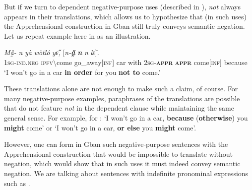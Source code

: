\documentclass[output=paper,colorlinks,citecolor=brown
]{langscibook}
\begin{document}
But if we turn to dependent negative-purpose uses (described in ), \textit{not} always appears in their translations, which allows us to hypothesize that (in such uses) the Apprehensional construction in Gban still truly conveys semantic negation. Let us repeat example  here in  as an illustration.


\ea \label{ex:Fed69}
\gll \textit{Mȁ̰-{\à}} \textit{n{\ù}} \textit{yà} \textit{wȍtló} \textit{yɛ̋,} \textup{[}\textit{n-\textbf{a̰̋}} \textit{\textbf{n{\ù}}} \textit{n{\ù}} \textit{lɛ̌}\textup{]}\textit{.}\\
\textsc{1sg-ind.neg} \textsc{ipfv\backslash}come go\_away[\textsc{inf}] car with \textsc{2sg-\textbf{appr}} \textsc{\textbf{appr}} come[\textsc{inf}] because \\
\glt `I won't go in a car \textbf{in order} for you \textbf{not to} come.'
\z

 These translations alone are not enough to make such a claim, of course. For many negative-purpose examples, paraphrases of the translations are possible that do not feature \textit{not} in the dependent clause while maintaining the same general sense. For example, for : `I won't go in a car, \textbf{because} (\textbf{otherwise}) you \textbf{might} come' or `I won't go in a car, \textbf{or else} you \textbf{might} come'.

However, one can form in Gban such negative-purpose sentences with the Apprehensional construction that would be impossible to translate without negation, which would show that in such uses it must indeed convey semantic negation. We are talking about sentences with indefinite pronominal expressions such as .

\z
\end{document}
